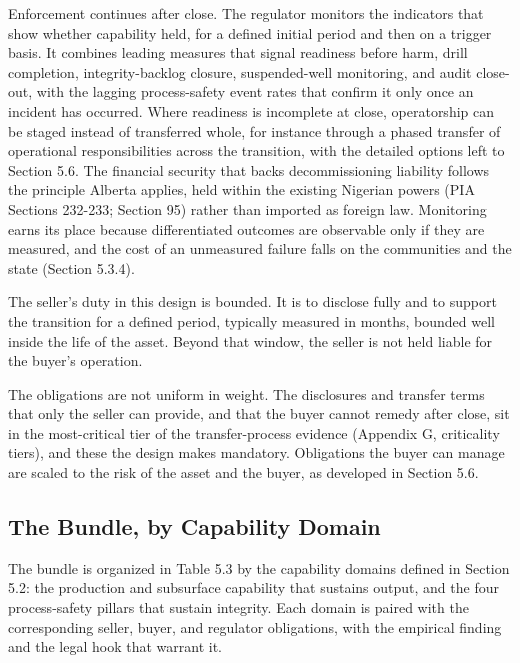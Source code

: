 Enforcement continues after close. The regulator monitors the indicators
that show whether capability held, for a defined initial period and then
on a trigger basis. It combines leading measures that signal readiness
before harm, drill completion, integrity-backlog closure, suspended-well
monitoring, and audit close-out, with the lagging process-safety event
rates that confirm it only once an incident has occurred. Where
readiness is incomplete at close, operatorship can be staged instead of
transferred whole, for instance through a phased transfer of operational
responsibilities across the transition, with the detailed options left
to Section 5.6. The financial security that backs decommissioning
liability follows the principle Alberta applies, held within the
existing Nigerian powers (PIA Sections 232-233; Section 95) rather than
imported as foreign law. Monitoring earns its place because
differentiated outcomes are observable only if they are measured, and
the cost of an unmeasured failure falls on the communities and the state
(Section 5.3.4).

The seller's duty in this design is bounded. It is to disclose fully and
to support the transition for a defined period, typically measured in
months, bounded well inside the life of the asset. Beyond that window,
the seller is not held liable for the buyer's operation.

The obligations are not uniform in weight. The disclosures and transfer
terms that only the seller can provide, and that the buyer cannot remedy
after close, sit in the most-critical tier of the transfer-process
evidence (Appendix G, criticality tiers), and these the design makes
mandatory. Obligations the buyer can manage are scaled to the risk of
the asset and the buyer, as developed in Section 5.6.

\hypertarget{the-bundle-by-capability-domain}{%
\subsection{The Bundle, by Capability
Domain}\label{the-bundle-by-capability-domain}}

The bundle is organized in Table 5.3 by the capability domains defined
in Section 5.2: the production and subsurface capability that sustains
output, and the four process-safety pillars that sustain integrity. Each
domain is paired with the corresponding seller, buyer, and regulator
obligations, with the empirical finding and the legal hook that warrant
it.

